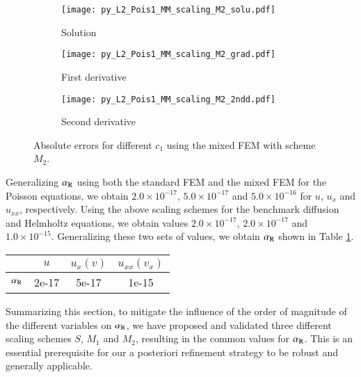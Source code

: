\documentclass[review,3p]{elsarticle}
\begin{document}
\begin{figure}[!ht]
    \begin{subfigure}{5.5cm}
        \texttt{[image: py\_L2\_Pois1\_MM\_scaling\_M2\_solu.pdf]}
        \caption{Solution}
        \label{py_L2_Pois1_MM_scaling_M2_solu}
    \end{subfigure}
    \hspace{-0.2cm}
    \begin{subfigure}{5.5cm}
        \texttt{[image: py\_L2\_Pois1\_MM\_scaling\_M2\_grad.pdf]}
        \caption{First derivative}
        \label{py_L2_Pois1_MM_scaling_M2_grad}
    \end{subfigure}
    \hspace{-0.2cm}
    \begin{subfigure}{5.5cm}
        \texttt{[image: py\_L2\_Pois1\_MM\_scaling\_M2\_2ndd.pdf]}
        \caption{Second derivative}
        \label{py_L2_Pois1_MM_scaling_M2_2ndd}
    \end{subfigure}
\caption{Absolute errors for different $c_1$ using the mixed FEM with scheme $M_2$.}
\label{Pois_pLov2pi2sin_MM_rhs M2}
\end{figure}


Generalizing $\alpha_{\rm R}$ using both the standard FEM and the mixed FEM for the Poisson equations, we obtain $2.0\times10^{-17}$, $5.0\times10^{-17}$ and $5.0\times10^{-16}$ for $u$, $u_{x}$ and $u_{xx}$, respectively. Using the above scaling schemes for the benchmark diffusion and Helmholtz equations, we obtain values $2.0\times10^{-17}$, $2.0\times10^{-17}$ and $1.0\times10^{-15}$.
Generalizing these two sets of values, we obtain $\alpha_{\rm R}$ shown in Table \ref{value_alpha_R_generalized}.

\begin{table}[!ht]
\centering
\begin{tabular}{c c c c}
\hline
 & $u$ & $u_x(v)$ & $u_{xx}(v_x)$ \\ \hline 
$\alpha_{\rm R}$ & 2e-17 & 5e-17 & 1e-15 \\ \hline
\end{tabular}
\label{value_alpha_R_generalized}
\end{table}

Summarizing this section, to mitigate the influence of the order of magnitude of the different variables on $\alpha_{\rm R}$, we have proposed and validated three different scaling schemes $S$, $M_1$ and $M_2$, resulting in the common values for $\alpha_{\rm R}$.
This is an essential prerequisite for our a posteriori refinement strategy to be robust and generally applicable.
\end{document}

